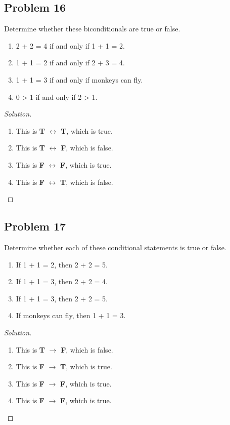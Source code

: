 \documentclass{article}
\newenvironment{solution}{\renewcommand\qedsymbol{}\begin{proof}[Solution]}{\end{proof}}
\begin{document}
\clearpage
\subsection*{Problem 16}
Determine whether these biconditionals are true or false.
\begin{enumerate}[leftmargin=16pt, topsep = 8pt]
\item 2 + 2 = 4 if and only if 1 + 1 = 2.
\item 1 + 1 = 2 if and only if 2 + 3 = 4.
\item 1 + 1 = 3 if and only if monkeys can fly.
\item 0 > 1 if and only if 2 > 1.
\end{enumerate}

\begin{solution}
\hspace{1pt}

\begin{enumerate}[leftmargin=16pt, topsep = 8pt]
\item This is \textbf{T} $\leftrightarrow$ \textbf{T}, which is true.
\item This is \textbf{T} $\leftrightarrow$ \textbf{F}, which is false.
\item This is \textbf{F} $\leftrightarrow$ \textbf{F}, which is true.
\item This is \textbf{F} $\leftrightarrow$ \textbf{T}, which is false.
\end{enumerate}
\end{solution}
\subsection*{Problem 17}
Determine whether each of these conditional statements is true or false.
\begin{enumerate}[leftmargin=16pt, topsep = 8pt]
\item If 1 + 1 = 2, then 2 + 2 = 5.
\item If 1 + 1 = 3, then 2 + 2 = 4.
\item If 1 + 1 = 3, then 2 + 2 = 5.
\item If monkeys can fly, then 1 + 1 = 3.
\end{enumerate}

\begin{solution}
\hspace{1pt}

\begin{enumerate}[leftmargin=16pt, topsep = 8pt]
\item This is \textbf{T} $\rightarrow$ \textbf{F}, which is false.
\item This is \textbf{F} $\rightarrow$ \textbf{T}, which is true.
\item This is \textbf{F} $\rightarrow$ \textbf{F}, which is true.
\item This is \textbf{F} $\rightarrow$ \textbf{F}, which is true.
\end{enumerate}
\end{solution}
\end{document}
